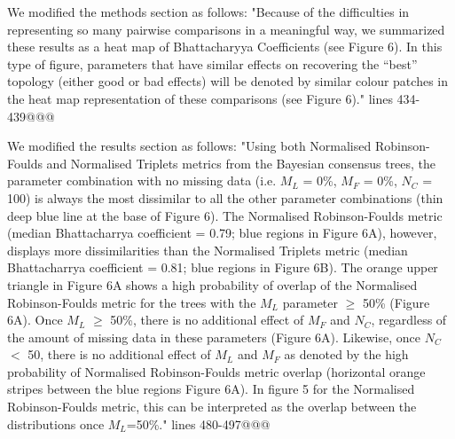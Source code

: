\documentclass[12pt,letterpaper]{article}
\begin{document}
\begin{enumerate}
We modified the methods section as follows:
"Because of the difficulties in representing so many pairwise comparisons in a meaningful way, we summarized these results as a heat map of Bhattacharyya Coefficients (see Figure 6).
In this type of figure, parameters that have similar effects on recovering the ``best'' topology (either good or bad effects) will be denoted by similar colour patches in the heat map representation of these comparisons (see Figure 6)." lines 434-439@@@

We modified the results section as follows:
"Using both Normalised Robinson-Foulds and Normalised Triplets metrics from the Bayesian consensus trees, the parameter combination with no missing data (i.e. $M_{L}$ = 0\%, $M_{F}$ = 0\%, $N_{C}$ = 100) is always the most dissimilar to all the other parameter combinations (thin deep blue line at the base of Figure 6).
The Normalised Robinson-Foulds metric (median Bhattacharrya coefficient = 0.79; blue regions in Figure 6A), however, displays more dissimilarities than the Normalised Triplets metric (median Bhattacharrya coefficient = 0.81; blue regions in Figure 6B).
The orange upper triangle in Figure 6A shows a high probability of overlap of the Normalised Robinson-Foulds metric for the trees with the $M_{L}$ parameter $\geq$ 50\% (Figure 6A).
Once $M_{L}$ $\geq$ 50\%, there is no additional effect of $M_{F}$ and $N_{C}$, regardless of the amount of missing data in these parameters (Figure 6A).
Likewise, once $N_{C}$ $<$ 50, there is no additional effect of $M_{L}$ and $M_{F}$ as denoted by the high probability of Normalised Robinson-Foulds metric overlap (horizontal orange stripes between the blue regions Figure 6A).
In figure 5 for the Normalised Robinson-Foulds metric, this can be interpreted as the overlap between the distributions once $M_L$=50\%." lines 480-497@@@


\end{enumerate}
\end{document}
